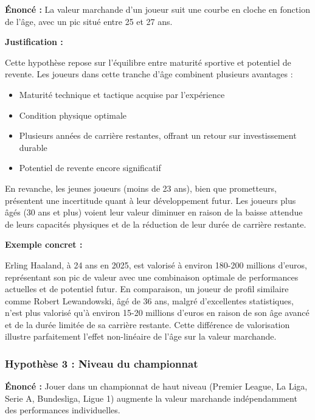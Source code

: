 \documentclass[12pt,a4paper]{article}
\begin{document}
\begin{tcolorbox}[colback=lightgray,colframe=maincolor,width=\textwidth,arc=2mm,boxrule=0.8pt]
    \textbf{Énoncé :} La valeur marchande d'un joueur suit une courbe en cloche en fonction de l'âge, avec un pic situé entre 25 et 27 ans.
\end{tcolorbox}

\textbf{Justification :}

Cette hypothèse repose sur l'équilibre entre maturité sportive et potentiel de revente. Les joueurs dans cette tranche d'âge combinent plusieurs avantages :

\begin{itemize}
    \item Maturité technique et tactique acquise par l'expérience
    \item Condition physique optimale
    \item Plusieurs années de carrière restantes, offrant un retour sur investissement durable
    \item Potentiel de revente encore significatif
\end{itemize}

En revanche, les jeunes joueurs (moins de 23 ans), bien que prometteurs, présentent une incertitude quant à leur développement futur. Les joueurs plus âgés (30 ans et plus) voient leur valeur diminuer en raison de la baisse attendue de leurs capacités physiques et de la réduction de leur durée de carrière restante.

\textbf{Exemple concret :}

Erling Haaland, à 24 ans en 2025, est valorisé à environ 180-200 millions d'euros, représentant son pic de valeur avec une combinaison optimale de performances actuelles et de potentiel futur. En comparaison, un joueur de profil similaire comme Robert Lewandowski, âgé de 36 ans, malgré d'excellentes statistiques, n'est plus valorisé qu'à environ 15-20 millions d'euros en raison de son âge avancé et de la durée limitée de sa carrière restante. Cette différence de valorisation illustre parfaitement l'effet non-linéaire de l'âge sur la valeur marchande.

\subsubsection{Hypothèse 3 : Niveau du championnat}

\begin{tcolorbox}[colback=lightgray,colframe=maincolor,width=\textwidth,arc=2mm,boxrule=0.8pt]
    \textbf{Énoncé :} Jouer dans un championnat de haut niveau (Premier League, La Liga, Serie A, Bundesliga, Ligue 1) augmente la valeur marchande indépendamment des performances individuelles.
\end{tcolorbox}
\end{document}
